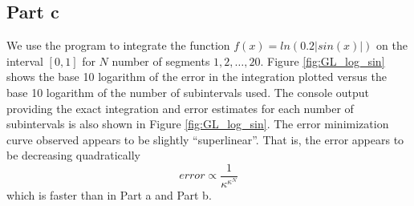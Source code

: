 \documentclass[11pt]{article}
\begin{document}
\FloatBarrier
\subsection*{Part c}
We use the program to integrate the function $f(x) = ln(0.2 |sin(x)|)$ on the interval $[0, 1]$ for $N$ number of segments $1, 2, \ldots , 20$. Figure \ref{fig:GL_log_sin} shows the base 10 logarithm of the error in the integration plotted versus the base 10 logarithm of the number of subintervals used. The console output providing the exact integration and error estimates for each number of subintervals is also shown in Figure \ref{fig:GL_log_sin}. The error minimization curve observed appears to be slightly ``superlinear''. That is, the error appears to be decreasing quadratically
$$error \propto \frac{1}{\kappa^{\kappa^{N}}}$$
which is faster than in Part a and Part b.
\end{document}
